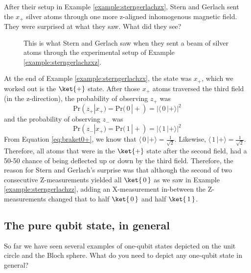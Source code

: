 \documentclass{article}
\theoremstyle{definition}
\newcommand{\abs}[1]{{\big\vert} #1 {\big\vert}}
\newcommand{\kz}[1]{\ket{\,#1\,}}
\newcommand{\kx}[1]{\ket{#1}}
\begin{document}
\begin{example} \label{example:sterngerlachzxz}
	After their setup in Example \ref{example:sterngerlachzx}, Stern and Gerlach sent the $x_+$ silver atoms through one more z-aligned inhomogenous magnetic field.  They were surprised at what they saw.  What did they see?
	
	\begin{figure}[H]
		\caption{This is what Stern and Gerlach saw when they sent a beam of silver atoms through the experimental setup of Example \ref{example:sterngerlachzxz}.}
	\end{figure}

	\textnormal{At the end of Example \ref{example:sterngerlachzx}, the state was $x_+$, which we worked out is the $\kx+$ state.  After those $x_+$ atoms traversed the third field (in the z-direction), the probability of observing $z_+$ was
	\begin{equation}
		\text{Pr}(z_+|x_+) = \text{Pr}(\,0\,|+) = \abs{\langle\,0\,|+\rangle}^2
	\end{equation}
	and the probability of observing $z_-$ was
	\begin{equation}
		\text{Pr}(z_-|x_+) = \text{Pr}(\,1\,|+) = \abs{\langle\,1\,|+\rangle}^2
	\end{equation}
	From Equation \ref{eq:braket0+}, we know that $\langle\,0\,|+\rangle = \frac{1}{\sqrt{2}}$.  Likewise, $\langle\,1\,|+\rangle = \frac{1}{\sqrt{2}}$.  Therefore, all atoms that were in the $\kx+$ state after the second field, had a 50-50 chance of being deflected up or down by the third field.  Therefore, the reason for Stern and Gerlach's surprise was that although the second of two consecutive Z-measurements yielded all $\kz0$ as we saw in Example \ref{example:sterngerlachzz}, adding an X-measurement in-between the Z-measurements changed that to half $\kz0$ and half $\kz1$.}
\end{example}

\newpage
\subsection{The pure qubit state, in general}
So far we have seen several examples of one-qubit states depicted on the unit circle and the Bloch sphere.  What do you need to depict any one-qubit state in general?
\end{document}
